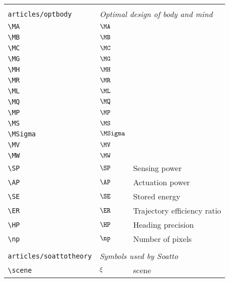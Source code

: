 \begin{longtable}{lll}
  &  & \\ 
 {\color[rgb]{0.5,0.5,0.5}\texttt{articles/optbody}} & \multicolumn{2}{l}{\emph{Optimal design of body and mind}}\\ 
 \hline
{\color[rgb]{0.5,0.5,0.5}\texttt{\textbackslash MA}} & $\MA$ & \\ 
 {\color[rgb]{0.5,0.5,0.5}\texttt{\textbackslash MB}} & $\MB$ & \\ 
 {\color[rgb]{0.5,0.5,0.5}\texttt{\textbackslash MC}} & $\MC$ & \\ 
 {\color[rgb]{0.5,0.5,0.5}\texttt{\textbackslash MG}} & $\MG$ & \\ 
 {\color[rgb]{0.5,0.5,0.5}\texttt{\textbackslash MH}} & $\MH$ & \\ 
 {\color[rgb]{0.5,0.5,0.5}\texttt{\textbackslash MR}} & $\MR$ & \\ 
 {\color[rgb]{0.5,0.5,0.5}\texttt{\textbackslash ML}} & $\ML$ & \\ 
 {\color[rgb]{0.5,0.5,0.5}\texttt{\textbackslash MQ}} & $\MQ$ & \\ 
 {\color[rgb]{0.5,0.5,0.5}\texttt{\textbackslash MP}} & $\MP$ & \\ 
 {\color[rgb]{0.5,0.5,0.5}\texttt{\textbackslash MS}} & $\MS$ & \\ 
 {\color[rgb]{0.5,0.5,0.5}\texttt{\textbackslash MSigma}} & $\MSigma$ & \\ 
 {\color[rgb]{0.5,0.5,0.5}\texttt{\textbackslash MV}} & $\MV$ & \\ 
 {\color[rgb]{0.5,0.5,0.5}\texttt{\textbackslash MW}} & $\MW$ & \\ 
 {\color[rgb]{0.5,0.5,0.5}\texttt{\textbackslash SP}} & $\SP$ &  Sensing power\\ 
 {\color[rgb]{0.5,0.5,0.5}\texttt{\textbackslash AP}} & $\AP$ &  Actuation power\\ 
 {\color[rgb]{0.5,0.5,0.5}\texttt{\textbackslash SE}} & $\SE$ &  Stored energy\\ 
 {\color[rgb]{0.5,0.5,0.5}\texttt{\textbackslash ER}} & $\ER$ &  Trajectory efficiency ratio\\ 
 {\color[rgb]{0.5,0.5,0.5}\texttt{\textbackslash HP}} & $\HP$ &  Heading precision\\ 
 {\color[rgb]{0.5,0.5,0.5}\texttt{\textbackslash np}} & $\np$ &  Number of pixels\\ 
  &  & \\ 
 {\color[rgb]{0.5,0.5,0.5}\texttt{articles/soattotheory}} & \multicolumn{2}{l}{\emph{Symbols used by Soatto}}\\ 
 \hline
{\color[rgb]{0.5,0.5,0.5}\texttt{\textbackslash scene}} & $\xi$ &  scene\\ 

\end{longtable}
